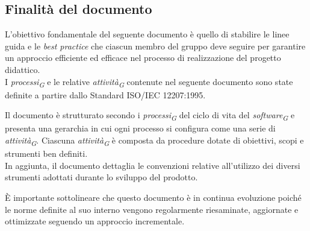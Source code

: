 \subsection{Finalità del documento}
L'obiettivo fondamentale del seguente documento è quello di stabilire le linee guida e le \textit{best practice} che ciascun membro del gruppo deve seguire per garantire un approccio efficiente ed efficace nel processo di realizzazione del progetto didattico.\\
I \textit{processi}\textsubscript{\textit{G}} e le relative \textit{attività}\textsubscript{\textit{G}} contenute nel seguente documento sono state definite a partire dallo Standard ISO/IEC 12207:1995.

\vspace{0.2cm}

Il documento è strutturato secondo i \textit{processi}\textsubscript{\textit{G}} del ciclo di vita del \textit{software}\textsubscript{\textit{G}} e presenta una gerarchia in cui ogni processo si configura come una serie di \textit{attività}\textsubscript{\textit{G}}. Ciascuna \textit{attività}\textsubscript{\textit{G}} è composta da procedure dotate di obiettivi, scopi e strumenti ben definiti.\\
In aggiunta, il documento dettaglia le convenzioni relative all'utilizzo dei diversi strumenti adottati durante lo sviluppo del prodotto.

\vspace{0.2cm}

È importante sottolineare che questo documento è in continua evoluzione poiché le norme definite al suo interno vengono regolarmente riesaminate, aggiornate e ottimizzate seguendo un approccio incrementale.\\
